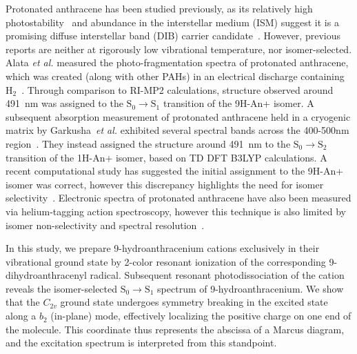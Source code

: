 \documentclass[journal=jpcafh,manuscript=article,layout=onecolumn, 12pt]{achemso}
\begin{document}



Protonated anthracene has been studied previously, as its relatively high photostability~\cite{joc99} and abundance in the interstellar medium (ISM) suggest it is a promising diffuse interstellar band (DIB) carrier candidate~\cite{mey21}. However, previous reports are neither at rigorously low vibrational temperature, nor isomer-selected. Alata \emph{et al.} measured the photo-fragmentation spectra of protonated anthracene, which was created (along with other PAHs) in an electrical discharge containing H$_2$~\cite{ala10}. Through comparison to RI-MP2 calculations, structure observed around 491~nm was assigned to the $\text{S}_0\rightarrow \text{S}_1$ transition of the 9H-An+ isomer. A subsequent absorption measurement of protonated anthracene held in a cryogenic matrix by Garkusha~\emph{et al.} exhibited several spectral bands across the 400-500nm region~\cite{gar11}. They instead assigned the structure around 491~nm to the $\text{S}_0\rightarrow \text{S}_2$ transition of the 1H-An+ isomer, based on TD DFT B3LYP calculations. A recent computational study has suggested the initial assignment to the 9H-An+ isomer was correct, however this discrepancy highlights the need for isomer selectivity~\cite{li21}. Electronic spectra of protonated anthracene have also been measured via helium-tagging action spectroscopy, however this technique is also limited by isomer non-selectivity and spectral resolution~\cite{mey21}.

In this study, we prepare 9-hydroanthracenium cations exclusively in their vibrational ground state by 2-color resonant ionization of the corresponding 9-dihydroanthracenyl radical. Subsequent resonant photodissociation of the cation reveals the isomer-selected $\text{S}_0\rightarrow\text{S}_1$ spectrum of 9-hydroanthracenium. We show that the $C_{2v}$ ground state undergoes symmetry breaking in the excited state along a $b_2$ (in-plane) mode, effectively localizing the positive charge on one end of the molecule. This coordinate thus represents the abscissa of a Marcus diagram, and the excitation spectrum is interpreted from this standpoint.
\end{document}
